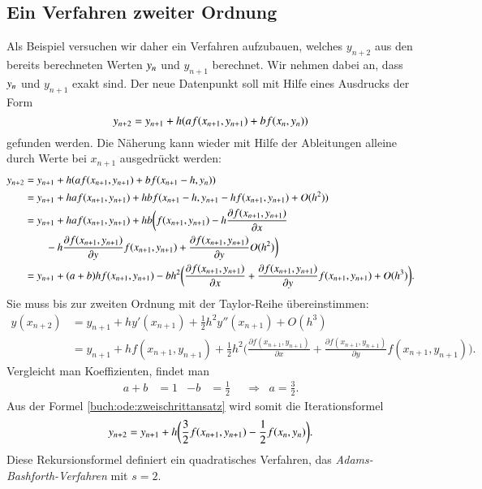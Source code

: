 \subsection{Ein Verfahren zweiter Ordnung
\label{buch:ode:subsection:zweiteordnung}}
Als Beispiel versuchen wir daher ein Verfahren aufzubauen, welches
$y_{n+2}$ aus den bereits berechneten Werten $y_{n\mathstrut}$ und
$y_{n+1}$ berechnet.
Wir nehmen dabei an, dass $y_{n\mathstrut}$ und $y_{n+1}$ exakt
sind.
Der neue Datenpunkt soll mit Hilfe eines Ausdrucks der Form
\begin{equation}
y_{n+2}
=
y_{n+1} + h(af(x_{n+1},y_{n+1}) + b f(x_{n\mathstrut},y_{n\mathstrut}))
\label{buch:ode:zweischrittansatz}
\end{equation}
gefunden werden.
Die Näherung kann wieder mit Hilfe der Ableitungen alleine
durch Werte bei $x_{n+1}$ ausgedrückt werden:
\begin{align*}
y_{n+2}
&=
y_{n+1}+h(af(x_{n+1}, y_{n+1}) + bf(x_{n+1}-h, y_{n\mathstrut}))
\\
&=
y_{n+1}+haf(x_{n+1}, y_{n+1}) + hbf(x_{n+1}-h, y_{n+1} - h f(x_{n+1},y_{n+1}) + O(h^2))
\\
&=
y_{n+1}+haf(x_{n+1}, y_{n+1}) + hb
\biggl(
f(x_{n+1},y_{n+1})
-h \frac{\partial f(x_{n+1},y_{n+1})}{\partial x}
\\
&\qquad
-h
\frac{\partial f(x_{n+1},y_{n+1})}{\partial y}
f(x_{n+1},y_{n+1})
+ 
\frac{\partial f(x_{n+1},y_{n+1})}{\partial y}
O(h^2)
\biggr)
\\
&=
y_{n+1}
+ (a+b)hf(x_{n+1},y_{n+1})
- bh^2\biggl(
\frac{\partial f(x_{n+1},y_{n+1})}{\partial x}
+
\frac{\partial f(x_{n+1},y_{n+1})}{\partial y}
f(x_{n+1},y_{n+1})
+O(h^3)
\biggr).
\end{align*}
Sie muss bis zur zweiten Ordnung mit der Taylor-Reihe übereinstimmen:
\begin{align*}
y(x_{n+2})
&=
y_{n+1} + hy'(x_{n+1}) + \frac12h^2 y''(x_{n+1})+O(h^3)
\\
&=
y_{n+1}+hf(x_{n+1},y_{n+1})+\frac12h^2\biggl(
\frac{\partial f(x_{n+1},y_{n+1})}{\partial x}
+
\frac{\partial f(x_{n+1},y_{n+1})}{\partial y}
f(x_{n+1},y_{n+1})
\biggr).
\end{align*}
Vergleicht man Koeffizienten, findet man
\[
\begin{aligned}
a+b&=1&-b&=\frac12&&\Rightarrow&a=\frac32.
\end{aligned}
\]
Aus der Formel \eqref{buch:ode:zweischrittansatz} wird somit die
Iterationsformel
\begin{equation}
y_{n+2}=y_{n+1}+h\biggl(\frac32f(x_{n+1},y_{n+1})
- \frac12 f(x_{n\mathstrut},y_{n\mathstrut})\biggr).
\end{equation}
Diese Rekursionsformel definiert ein quadratisches Verfahren, das
{\em Adams-Bashforth-Verfahren} mit $s=2$.

